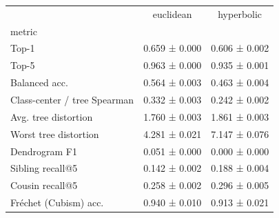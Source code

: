 \begin{tabular}{lcc}
\toprule
 & euclidean & hyperbolic \\
metric &  &  \\
\midrule
Top-1 & 0.659 ± 0.000 & 0.606 ± 0.002 \\
Top-5 & 0.963 ± 0.000 & 0.935 ± 0.001 \\
Balanced acc. & 0.564 ± 0.003 & 0.463 ± 0.004 \\
Class-center / tree Spearman & 0.332 ± 0.003 & 0.242 ± 0.002 \\
Avg. tree distortion & 1.760 ± 0.003 & 1.861 ± 0.003 \\
Worst tree distortion & 4.281 ± 0.021 & 7.147 ± 0.076 \\
Dendrogram F1 & 0.051 ± 0.000 & 0.000 ± 0.000 \\
Sibling recall@5 & 0.142 ± 0.002 & 0.188 ± 0.004 \\
Cousin recall@5 & 0.258 ± 0.002 & 0.296 ± 0.005 \\
Fréchet (Cubism) acc. & 0.940 ± 0.010 & 0.913 ± 0.021 \\
\bottomrule
\end{tabular}
